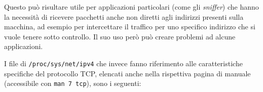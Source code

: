 \begin{basedescript}{\desclabelwidth{2.2cm}\desclabelstyle{\nextlinelabel}}
  Questo può risultare utile per applicazioni particolari (come gli
  \textit{sniffer}) che hanno la necessità di ricevere pacchetti anche non
  diretti agli indirizzi presenti sulla macchina, ad esempio per intercettare
  il traffico per uno specifico indirizzo che si vuole tenere sotto
  controllo. Il suo uso però può creare problemi ad alcune applicazioni.


\end{basedescript}

I file di \texttt{/proc/sys/net/ipv4} che invece fanno riferimento alle
caratteristiche specifiche del protocollo TCP, elencati anche nella rispettiva
pagina di manuale (accessibile con \texttt{man 7 tcp}), sono i seguenti:
